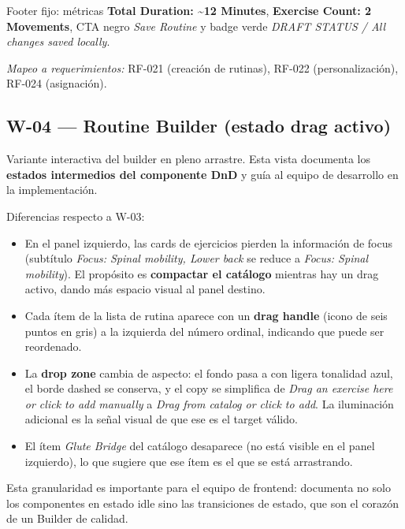 Footer fijo: métricas \textbf{Total Duration: \textasciitilde 12 Minutes}, \textbf{Exercise Count: 2 Movements}, CTA negro \textit{Save Routine} y badge verde \textit{DRAFT STATUS / All changes saved locally}.

\textit{Mapeo a requerimientos:} RF-021 (creación de rutinas), RF-022 (personalización), RF-024 (asignación).


\subsection{W-04 --- Routine Builder (estado drag activo)}

Variante interactiva del builder en pleno arrastre. Esta vista documenta los \textbf{estados intermedios del componente DnD} y guía al equipo de desarrollo en la implementación.

Diferencias respecto a W-03:

\begin{itemize}
  \item En el panel izquierdo, las cards de ejercicios pierden la información de focus (subtítulo \textit{Focus: Spinal mobility, Lower back} se reduce a \textit{Focus: Spinal mobility}). El propósito es \textbf{compactar el catálogo} mientras hay un drag activo, dando más espacio visual al panel destino.
  \item Cada ítem de la lista de rutina aparece con un \textbf{drag handle} (icono de seis puntos en gris) a la izquierda del número ordinal, indicando que puede ser reordenado.
  \item La \textbf{drop zone} cambia de aspecto: el fondo pasa a  con ligera tonalidad azul, el borde dashed se conserva, y el copy se simplifica de \textit{Drag an exercise here or click to add manually} a \textit{Drag from catalog or click to add}. La iluminación adicional es la señal visual de que ese es el target válido.
  \item El ítem \textit{Glute Bridge} del catálogo desaparece (no está visible en el panel izquierdo), lo que sugiere que ese ítem es el que se está arrastrando.
\end{itemize}

Esta granularidad es importante para el equipo de frontend: documenta no solo los componentes en estado idle sino las transiciones de estado, que son el corazón de un Builder de calidad.

